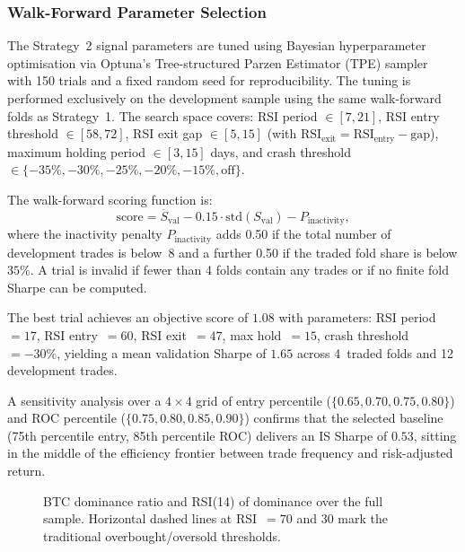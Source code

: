 \documentclass[11pt,a4paper]{article}
\begin{document}
\subsubsection{Walk-Forward Parameter Selection}

The Strategy~2 signal parameters are tuned using Bayesian hyperparameter optimisation via Optuna's Tree-structured Parzen Estimator (TPE) sampler~\cite{bergstra2011} with 150 trials and a fixed random seed for reproducibility.  The tuning is performed exclusively on the development sample using the same walk-forward folds as Strategy~1.  The search space covers: RSI period $\in [7, 21]$, RSI entry threshold $\in [58, 72]$, RSI exit gap $\in [5, 15]$ (with $\text{RSI}_{\text{exit}} = \text{RSI}_{\text{entry}} - \text{gap}$), maximum holding period $\in [3, 15]$ days, and crash threshold $\in \{-35\%, -30\%, -25\%, -20\%, -15\%, \text{off}\}$.

The walk-forward scoring function is:
\begin{equation}
  \text{score} = \overline{S}_{\text{val}} - 0.15 \cdot \text{std}(S_{\text{val}}) - P_{\text{inactivity}},
  \label{eq:wf-score-s2}
\end{equation}
where the inactivity penalty $P_{\text{inactivity}}$ adds 0.50 if the total number of development trades is below~8 and a further 0.50 if the traded fold share is below $35\%$.  A trial is invalid if fewer than 4 folds contain any trades or if no finite fold Sharpe can be computed.

The best trial achieves an objective score of $1.08$ with parameters: RSI period~$= 17$, RSI entry~$= 60$, RSI exit~$= 47$, max hold~$= 15$, crash threshold~$= -30\%$, yielding a mean validation Sharpe of $1.65$ across 4~traded folds and 12 development trades.

A sensitivity analysis over a $4 \times 4$ grid of entry percentile ($\{0.65, 0.70, 0.75, 0.80\}$) and ROC percentile ($\{0.75, 0.80, 0.85, 0.90\}$) confirms that the selected baseline (75th percentile entry, 85th percentile ROC) delivers an IS Sharpe of $0.53$, sitting in the middle of the efficiency frontier between trade frequency and risk-adjusted return.

\begin{figure}[H]
  \centering
  \caption{BTC dominance ratio and RSI(14) of dominance over the full sample.  Horizontal dashed lines at RSI~$= 70$ and $30$ mark the traditional overbought/oversold thresholds.}
  \label{fig:dom-rsi}
\end{figure}
\end{document}
